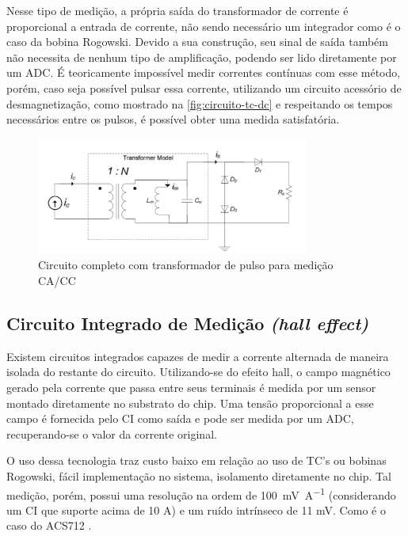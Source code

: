 Nesse tipo de medição, a própria saída do transformador de corrente é proporcional a entrada de corrente, não sendo necessário um integrador como é o caso da bobina Rogowski. Devido a sua construção, seu sinal de saída também não necessita de nenhum tipo de amplificação, podendo ser lido diretamente por um \gls{ADC}. É teoricamente impossível medir correntes contínuas com esse método, porém, caso seja possível pulsar essa corrente, utilizando um circuito acessório de desmagnetização, como mostrado na \autoref{fig:circuito-tc-dc} e respeitando os tempos necessários entre os pulsos, é possível obter uma medida satisfatória.

\begin{figure}[htb!]
    \caption{Circuito completo com transformador de pulso para medição \gls{CA}/\gls{CC}}
    \label{fig:circuito-tc-dc}
    \includegraphics[width=0.8\textwidth]{figuras/transform-corrente-dc.png}
\end{figure}

\subsection{Circuito Integrado de Medição \textit{(hall effect)}}\label{subsec:halleffect}

Existem circuitos integrados capazes de medir a corrente alternada de maneira isolada do restante do circuito. Utilizando-se do efeito hall, o campo magnético gerado pela corrente que passa entre seus terminais é medida por um sensor montado diretamente no substrato do chip. Uma tensão proporcional a esse campo é fornecida pelo CI como saída e pode ser medida por um ADC, recuperando-se o valor da corrente original.

O uso dessa tecnologia traz custo baixo em relação ao uso de TC's ou bobinas Rogowski, fácil implementação no sistema, isolamento diretamente no chip. Tal medição, porém, possui uma resolução na ordem de \SI{100}{\milli\volt\per\ampere} (considerando um CI que suporte acima de 10 A) e um ruído intrínseco de 11 mV. Como é o caso do ACS712 \citep{acs712}.

